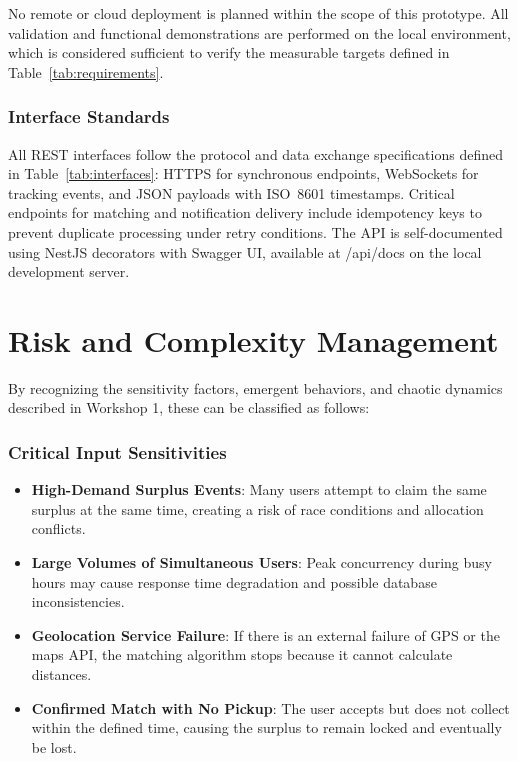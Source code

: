 \documentclass[conference]{IEEEtran}
\begin{document}
No remote or cloud deployment is planned within the scope of this prototype. All validation and functional demonstrations are performed on the local environment, which is considered sufficient to verify the measurable targets defined in Table~\ref{tab:requirements}.

\subsubsection{Interface Standards}

All REST interfaces follow the protocol and data exchange specifications defined in Table~\ref{tab:interfaces}: HTTPS for synchronous endpoints, WebSockets for tracking events, and JSON payloads with ISO~8601 timestamps. Critical endpoints for matching and notification delivery include idempotency keys to prevent duplicate processing under retry conditions. The API is self-documented using NestJS \@ApiProperty decorators with Swagger UI, available at /api/docs on the local development server.

\section{Risk and Complexity Management}
By recognizing the sensitivity factors, emergent behaviors, and chaotic dynamics described in Workshop 1, these can be classified as follows:
\subsubsection{Critical Input Sensitivities}

\begin{itemize}
    \item \textbf{High-Demand Surplus Events}: Many users attempt to claim the same surplus at the same time, creating a risk of race conditions and allocation conflicts.
    \item \textbf{Large Volumes of Simultaneous Users}: Peak concurrency during busy hours may cause response time degradation and possible database inconsistencies.
    \item \textbf{Geolocation Service Failure}: If there is an external failure of GPS or the maps API, the matching algorithm stops because it cannot calculate distances.
    \item \textbf{Confirmed Match with No Pickup}: The user accepts but does not collect within the defined time, causing the surplus to remain locked and eventually be lost.
\end{itemize}
\end{document}
